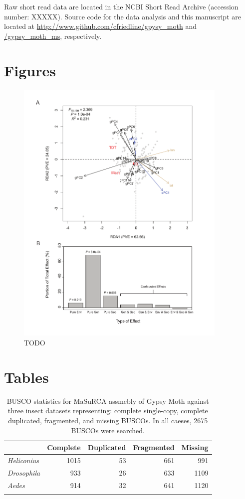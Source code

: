 \documentclass[smallextended]{svjour3}
\begin{document}
Raw short read data are located in the NCBI Short Read Archive (accession
number: XXXXX). Source code for the data analysis and this manuscript are
located at
\url{http://www.github.com/cfriedline/gpysy_moth} and \url{/gypsy_moth_ms},
respectively.


\clearpage



\clearpage


\section*{Figures}
\begin{figure}[ht]
\centering
\includegraphics[width=0.9\textwidth]{rda_fig}
\caption{TODO}
\label{fig:rda}
\end{figure}

\clearpage

\section*{Tables}
\begin{longtable}[]{@{}lrrrr@{}}
\caption{BUSCO statistics for MaSuRCA assmebly of Gypsy Moth against three insect 
datasets representing: complete single-copy, complete duplicated, fragmented, and 
missing BUSCOs. In all caeses, \num{2675} BUSCOs were searched.}\\
\toprule
& Complete & Duplicated & Fragmented & Missing\tabularnewline
\midrule
\endhead
\textit{Heliconius} & 1015 & 53 & 661 & 991\tabularnewline
\textit{Drosophila} & 933 & 26 & 633 & 1109\tabularnewline
\textit{Aedes} & 914 & 32 & 641 & 1120\tabularnewline
\bottomrule
\label{tab:busco}
\end{longtable}
\end{document}
